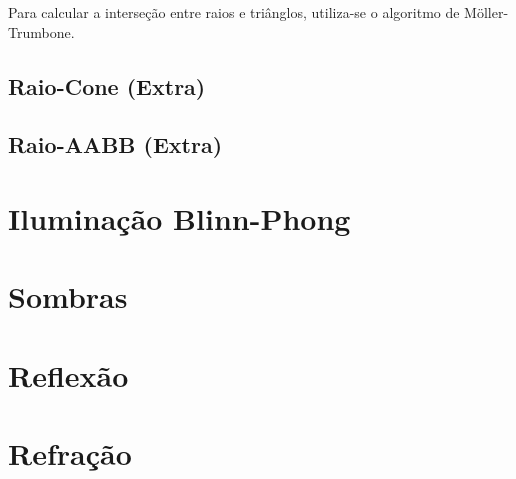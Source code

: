 \documentclass{article}
\begin{document}
        \par
        Para calcular a interseção entre raios e triânglos, utiliza-se o algoritmo de Möller-Trumbone.

    \subsection*{Raio-Cone (Extra)}

    \subsection*{Raio-AABB (Extra)}

    \section*{Iluminação Blinn-Phong}

    \section*{Sombras}

    \section*{Reflexão}

    \section*{Refração}
\end{document}
